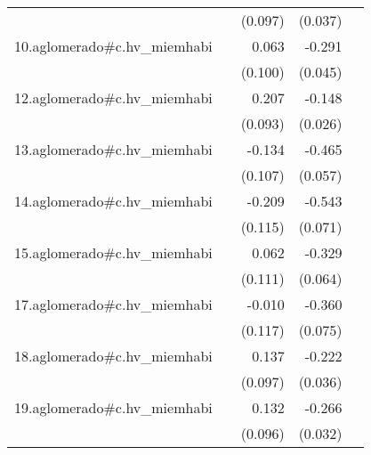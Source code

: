 {\begin{longtable}{l*{4}{D{.}{.}{-1}}}
            &                     &     (0.097)         &     (0.037)         &                     \\
\addlinespace
10.aglomerado#c.hv\_miemhabi&                     &       0.063         &      -0.291\sym{***}&                     \\
            &                     &     (0.100)         &     (0.045)         &                     \\
\addlinespace
12.aglomerado#c.hv\_miemhabi&                     &       0.207\sym{*}  &      -0.148\sym{***}&                     \\
            &                     &     (0.093)         &     (0.026)         &                     \\
\addlinespace
13.aglomerado#c.hv\_miemhabi&                     &      -0.134         &      -0.465\sym{***}&                     \\
            &                     &     (0.107)         &     (0.057)         &                     \\
\addlinespace
14.aglomerado#c.hv\_miemhabi&                     &      -0.209         &      -0.543\sym{***}&                     \\
            &                     &     (0.115)         &     (0.071)         &                     \\
\addlinespace
15.aglomerado#c.hv\_miemhabi&                     &       0.062         &      -0.329\sym{***}&                     \\
            &                     &     (0.111)         &     (0.064)         &                     \\
\addlinespace
17.aglomerado#c.hv\_miemhabi&                     &      -0.010         &      -0.360\sym{***}&                     \\
            &                     &     (0.117)         &     (0.075)         &                     \\
\addlinespace
18.aglomerado#c.hv\_miemhabi&                     &       0.137         &      -0.222\sym{***}&                     \\
            &                     &     (0.097)         &     (0.036)         &                     \\
\addlinespace
19.aglomerado#c.hv\_miemhabi&                     &       0.132         &      -0.266\sym{***}&                     \\
            &                     &     (0.096)         &     (0.032)         &                     \\

\end{longtable}}
